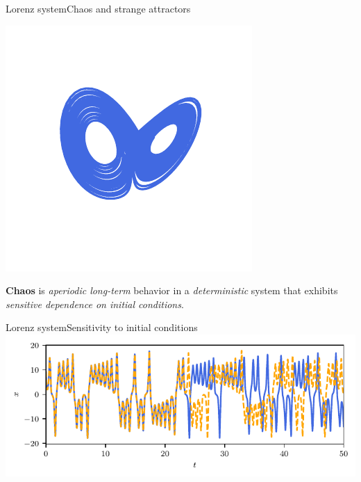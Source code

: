 \documentclass[usenames,dvipsnames,svgnames,10pt,aspectratio=169]{beamer}
\begin{document}
\begin{frame}[t, c]{Lorenz system}{Chaos and strange attractors}
	\begin{minipage}{.48\textwidth}
		\centering
		\includegraphics[width=.8\textwidth]{strange_attractor}
	\end{minipage}%
	\hfill
	\begin{minipage}{.48\textwidth}
		\alert{\textbf{Chaos}} is \emph{aperiodic long-term} behavior in a \emph{deterministic} system that exhibits \emph{sensitive dependence on initial conditions}.
	\end{minipage}

	\vspace{1cm}
\end{frame}

\begin{frame}[t, c]{Lorenz system}{Sensitivity to initial conditions}
	\centering
	\includegraphics[width=.75\textwidth]{sensitivity_initial_conditions}

	\vspace{1cm}
\end{frame}
\end{document}
